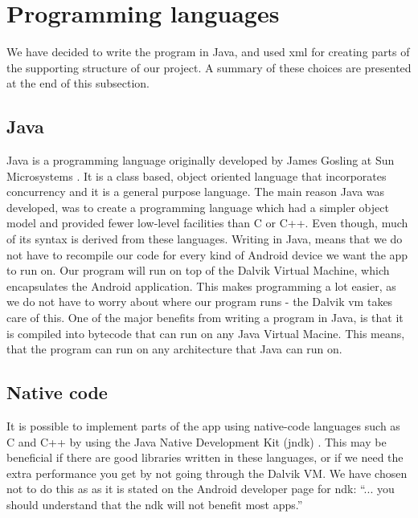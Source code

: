 
\section{Programming languages}
We have decided to write the program in Java, and used \gls{xml} for creating parts of the supporting structure of our project. A summary of these choices are presented at the end of this subsection.

\subsection{Java}
Java is a programming language originally developed by James Gosling at Sun Microsystems \cite{bib:java}. It is a class based, object oriented language that incorporates concurrency and it is a general purpose language. The main reason Java was developed, was to create a programming language which had a simpler object model and provided fewer low-level facilities than C or C++. Even though, much of its syntax is derived from these languages.
\newline
\newline
Writing in Java, means that we do not have to recompile our code for every kind of Android device we want the app to run on. Our program will run on top of the Dalvik Virtual Machine, which encapsulates the Android application. This makes programming a lot easier, as we do not have to worry about where our program runs - the Dalvik \gls{vm} takes care of this.
\newline
\newline
One of the major benefits from writing a program in Java, is that it is compiled into bytecode that can run on any Java Virtual Macine. This means, that the program can run on any architecture that Java can run on.

\subsection{Native code}
It is possible to implement parts of the app using native-code languages such as C and C++ by using the Java Native Development Kit (\gls{jndk}) \cite{bib:andk}. This may be beneficial if there are good libraries written in these languages, or if we need the extra performance you get by not going through the Dalvik VM. We have chosen not to do this as as it is stated on the Android developer page for \gls{ndk}: “... you should understand that the \gls{ndk} will not benefit most apps.”

\pagebreak

